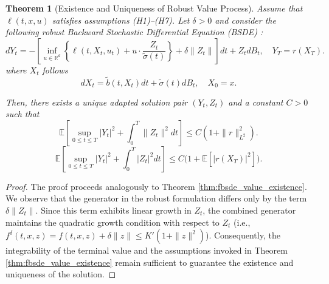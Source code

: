 \documentclass[11pt]{article}
\newtheorem{theorem}{Theorem}[section]
\def\w{\widetilde}
\begin{document}
\begin{theorem}[Existence and Uniqueness of Robust Value Process]
\label{thm:robust_value_existence}
Assume that $\ell(t,x,u)$ satisfies assumptions (H1)–(H7). Let $\delta > 0$ and consider the following robust Backward Stochastic Differential Equation (BSDE) :
\begin{equation}
\label{eq:robust_BSDE}
    dY_t = -\left[\inf_{u \in \mathbb{R}^d} \left\{ \ell(t,X_t,u_t) + u \cdot \frac{Z_t}{\w\sigma(t)} \right\} + \delta \|Z_t\| \right] dt + Z_t dB_t, \quad Y_T = r(X_T).
\end{equation}
where $X_t$ follows 
\begin{equation}
dX_t =\w b(t,X_t)dt + \w\sigma(t) dB_t,\quad X_0=x.    
\end{equation}

Then, there exists a unique adapted solution pair $(Y_t, Z_t)$ and a constant $C > 0$ such that
\begin{equation}
\mathbb{E}\left[ \sup_{0 \le t \le T} |Y_t|^2 + \int_0^T \|Z_t\|^2 dt \right] \le C \left( 1 + \|r\|_{L^2}^2 \right).
\end{equation}
\begin{equation}\label{eq:est}
\mathbb{E}\left[\sup_{0\le t\le T}|Y_t|^2 + \int_0^T |Z_t|^2 dt\right] \le C\bigl(1+\mathbb{E}[|r(X_T)|^2]\bigr).
\end{equation}

\end{theorem}

\begin{proof}
The proof proceeds analogously to Theorem \ref{thm:fbsde_value_existence}. We observe that the generator in the robust formulation differs only by the term $\delta \|Z_t\|$. Since this term exhibits linear growth in $Z_t$, the combined generator maintains the quadratic growth condition with respect to $Z_t$ (i.e., $f^\delta(t,x,z) = f(t,x,z) + \delta \|z\| \le K'(1+\|z\|^2)$). Consequently, the integrability of the terminal value and the assumptions invoked in Theorem \ref{thm:fbsde_value_existence} remain sufficient to guarantee the existence and uniqueness of the solution.
\end{proof}
\end{document}
